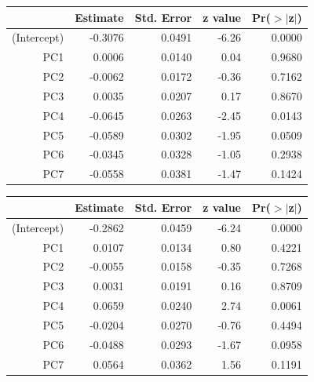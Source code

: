 \documentclass[a4paper,12pt]{Latex/Classes/PhDthesisPSnPDF}
\begin{document}
\begin{center}
\begin{table}[ht]
\centering
\begin{tabular}{rrrrr}
  \hline
 & Estimate & Std. Error & z value & Pr($>$$|$z$|$) \\ 
  \hline
(Intercept) & -0.3076 & 0.0491 & -6.26 & 0.0000 \\ 
  PC1 & 0.0006 & 0.0140 & 0.04 & 0.9680 \\ 
  PC2 & -0.0062 & 0.0172 & -0.36 & 0.7162 \\ 
  PC3 & 0.0035 & 0.0207 & 0.17 & 0.8670 \\ 
  PC4 & -0.0645 & 0.0263 & -2.45 & 0.0143 \\ 
  PC5 & -0.0589 & 0.0302 & -1.95 & 0.0509 \\ 
  PC6 & -0.0345 & 0.0328 & -1.05 & 0.2938 \\ 
  PC7 & -0.0558 & 0.0381 & -1.47 & 0.1424 \\ 
   \hline
\end{tabular}
\end{table}\end{center}
\newpage
\begin{center}
\begin{table}[ht]
\centering
\begin{tabular}{rrrrr}
  \hline
 & Estimate & Std. Error & z value & Pr($>$$|$z$|$) \\ 
  \hline
(Intercept) & -0.2862 & 0.0459 & -6.24 & 0.0000 \\ 
  PC1 & 0.0107 & 0.0134 & 0.80 & 0.4221 \\ 
  PC2 & -0.0055 & 0.0158 & -0.35 & 0.7268 \\ 
  PC3 & 0.0031 & 0.0191 & 0.16 & 0.8709 \\ 
  PC4 & 0.0659 & 0.0240 & 2.74 & 0.0061 \\ 
  PC5 & -0.0204 & 0.0270 & -0.76 & 0.4494 \\ 
  PC6 & -0.0488 & 0.0293 & -1.67 & 0.0958 \\ 
  PC7 & 0.0564 & 0.0362 & 1.56 & 0.1191 \\ 
   \hline
\end{tabular}
\end{table}\end{center}
\end{document}
